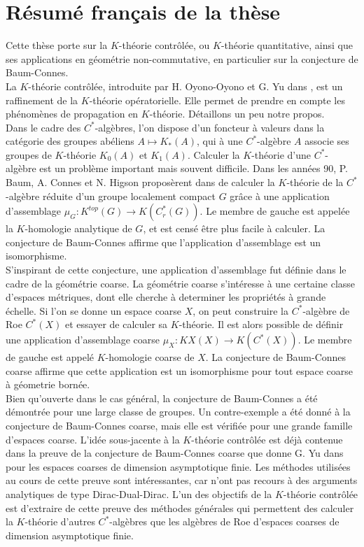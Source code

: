\section*{Résumé français de la thèse}

Cette thèse porte sur la $K$-théorie contrôlée, ou $K$-théorie quantitative, ainsi que ses applications en géométrie non-commutative, en particulier sur la conjecture de Baum-Connes.\\

La $K$-théorie contrôlée, introduite par H. Oyono-Oyono et G. Yu dans \cite{OY2}, est un raffinement de la $K$-théorie opératorielle. Elle permet de prendre en compte les phénomènes de propagation en $K$-théorie. Détaillons un peu notre propos.\\

Dans le cadre des $C^*$-algèbres, l'on dispose d'un foncteur à valeurs dans la catégorie des groupes abéliens $A\mapsto K_*(A)$, qui à une $C^*$-algèbre $A$ associe ses groupes de $K$-théorie $K_0(A)$ et $K_1(A)$. Calculer la $K$-théorie d'une $C^*$-algèbre est un problème important mais souvent difficile. Dans les années 90, P. Baum, A. Connes et N. Higson proposèrent dans \cite{BaumConnesHigson} de calculer la $K$-théorie de la $C^*$-algèbre réduite d'un groupe localement compact $G$ grâce à une application d'assemblage $\mu_G : K^{top}(G)\rightarrow K(C_r^*(G))$. Le membre de gauche est appelée la $K$-homologie analytique de $G$, et est censé être plus facile à calculer. La conjecture de Baum-Connes affirme que l'application d'assemblage est un isomorphisme.\\

S'inspirant de cette conjecture, une application d'assemblage fut définie dans le cadre de la géométrie coarse. La géométrie coarse s'intéresse à une certaine classe d'espaces métriques, dont elle cherche à determiner les propriétés à grande échelle. Si l'on se donne un espace coarse $X$, on peut construire la $C^*$-algèbre de Roe $C^*(X)$ et essayer de calculer sa $K$-théorie. Il est alors possible de définir une application d'assemblage coarse $\mu_X : KX(X)\rightarrow K(C^*(X))$. Le membre de gauche est appelé $K$-homologie coarse de $X$. La conjecture de Baum-Connes coarse affirme que cette application est un isomorphisme pour tout espace coarse à géometrie bornée.\\

Bien qu'ouverte dans le cas général, la conjecture de Baum-Connes a été démontrée pour une large classe de groupes. Un contre-exemple a été donné à la conjecture de Baum-Connes coarse, mais elle est vérifiée pour une grande famille d'espaces coarse. L'idée sous-jacente à la $K$-théorie contrôlée est déjà contenue dans la preuve de la conjecture de Baum-Connes coarse que donne G. Yu dans \cite{Yu1} pour les espaces coarses de dimension asymptotique finie. Les méthodes utilisées au cours de cette preuve sont intéressantes, car n'ont pas recours à des arguments analytiques de type Dirac-Dual-Dirac. L'un des objectifs de la $K$-théorie contrôlée est d'extraire de cette preuve des méthodes générales qui permettent des calculer la $K$-théorie d'autres $C^*$-algèbres que les algèbres de Roe d'espaces coarses de dimension asymptotique finie.\\

